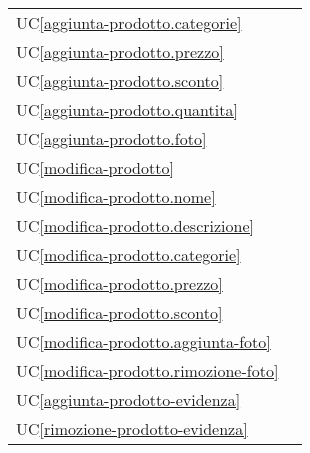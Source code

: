 \begin{longtable}{C{6cm} C{6cm}}
	UC\ref{aggiunta-prodotto.categorie} &  \\

    UC\ref{aggiunta-prodotto.prezzo} &  \\

	UC\ref{aggiunta-prodotto.sconto} &  \\

    UC\ref{aggiunta-prodotto.quantita} &  \\

	UC\ref{aggiunta-prodotto.foto} &  \\

    UC\ref{modifica-prodotto} &  \\

	UC\ref{modifica-prodotto.nome} &  \\

    UC\ref{modifica-prodotto.descrizione} &  \\

	UC\ref{modifica-prodotto.categorie} &  \\

    UC\ref{modifica-prodotto.prezzo} &  \\

	UC\ref{modifica-prodotto.sconto} &  \\

    UC\ref{modifica-prodotto.aggiunta-foto} &  \\

	UC\ref{modifica-prodotto.rimozione-foto} &  \\

    UC\ref{aggiunta-prodotto-evidenza} &  \\

	UC\ref{rimozione-prodotto-evidenza} &  \\


\end{longtable}
